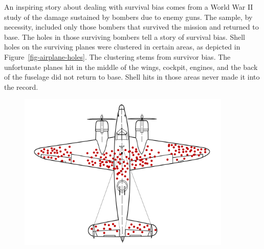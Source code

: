 \documentclass[
  letterpaper,
  DIV=11,
  numbers=noendperiod,
  oneside]{scrreprt}
\begin{document}
\begin{tcolorbox}[enhanced jigsaw, colbacktitle=quarto-callout-note-color!10!white, breakable, opacitybacktitle=0.6, colback=white, left=2mm, arc=.35mm, colframe=quarto-callout-note-color-frame, coltitle=black, toprule=.15mm, opacityback=0, leftrule=.75mm, bottomtitle=1mm, toptitle=1mm, titlerule=0mm, title=\textcolor{quarto-callout-note-color}{\faInfo}\hspace{0.5em}{Examples: Returned to base}, rightrule=.15mm, bottomrule=.15mm]

An inspiring story about dealing with survival bias comes from a World
War II study of the damage sustained by bombers due to enemy guns. The
sample, by necessity, included only those bombers that survived the
mission and returned to base. The holes in those surviving bombers tell
a story of survival bias. Shell holes on the surviving planes were
clustered in certain areas, as depicted in
Figure~\ref{fig-airplane-holes}. The clustering stems from survivor
bias. The unfortunate planes hit in the middle of the wings, cockpit,
engines, and the back of the fuselage did not return to base. Shell hits
in those areas never made it into the record.

\begin{figure}[H]


{\centering \includegraphics[width=4in,height=\textheight]{./www/bomber-holes.png}

}

\end{figure}

\end{tcolorbox}
\end{document}
